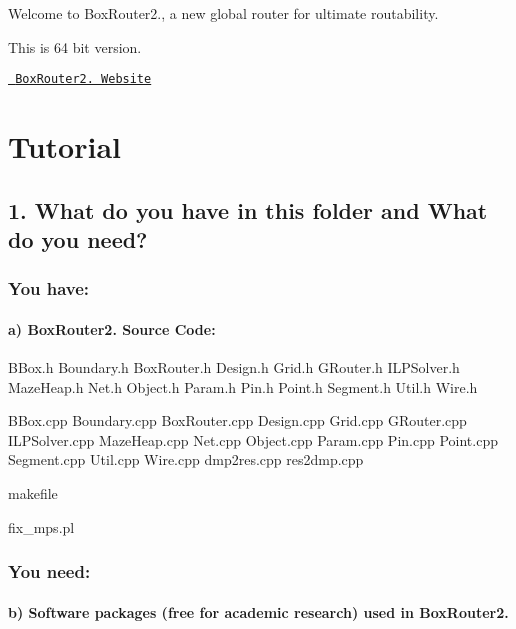 Welcome to Box\+Router2., a new global router for ultimate routability.

This is 64 bit version.

\href{https://www.cerc.utexas.edu/utda/download/BoxRouter.htm}{\texttt{ Box\+Router2. Website}}



 \section*{Tutorial}

\subsection*{1. What do you have in this folder and What do you need?}

\subsubsection*{You have\+:}

\paragraph*{a) Box\+Router2. Source Code\+:}


\begin{DoxyItemize}
\item B\+Box.\+h Boundary.\+h Box\+Router.\+h Design.\+h Grid.\+h G\+Router.\+h I\+L\+P\+Solver.\+h Maze\+Heap.\+h Net.\+h Object.\+h Param.\+h Pin.\+h Point.\+h Segment.\+h Util.\+h Wire.\+h
\item B\+Box.\+cpp Boundary.\+cpp Box\+Router.\+cpp Design.\+cpp Grid.\+cpp G\+Router.\+cpp I\+L\+P\+Solver.\+cpp Maze\+Heap.\+cpp Net.\+cpp Object.\+cpp Param.\+cpp Pin.\+cpp Point.\+cpp Segment.\+cpp Util.\+cpp Wire.\+cpp dmp2res.\+cpp res2dmp.\+cpp
\item makefile
\item fix\+\_\+mps.\+pl
\end{DoxyItemize}

\subsubsection*{You need\+:}

\paragraph*{b) Software packages (free for academic research) used in Box\+Router2.}


